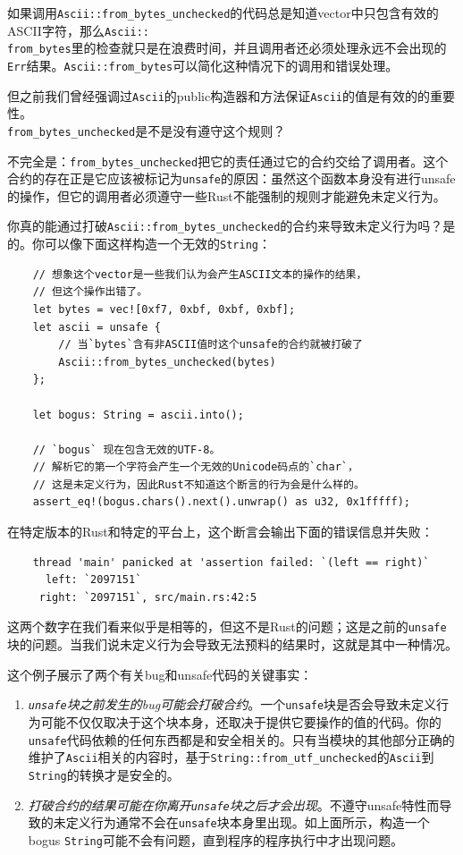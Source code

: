 如果调用\texttt{Ascii::from\_bytes\_unchecked}的代码总是知道vector中只包含有效的ASCII字符，那么\texttt{Ascii::\\
from\_bytes}里的检查就只是在浪费时间，并且调用者还必须处理永远不会出现的\texttt{Err}结果。\texttt{Ascii::from\_bytes}可以简化这种情况下的调用和错误处理。

但之前我们曾经强调过\texttt{Ascii}的public构造器和方法保证\texttt{Ascii}的值是有效的的重要性。\\
\texttt{from\_bytes\_unchecked}是不是没有遵守这个规则？

不完全是：\texttt{from\_bytes\_unchecked}把它的责任通过它的合约交给了调用者。这个合约的存在正是它应该被标记为\texttt{unsafe}的原因：虽然这个函数本身没有进行unsafe的操作，但它的调用者必须遵守一些Rust不能强制的规则才能避免未定义行为。

你真的能通过打破\texttt{Ascii::from\_bytes\_unchecked}的合约来导致未定义行为吗？是的。你可以像下面这样构造一个无效的\texttt{String}：
\begin{verbatim}
    // 想象这个vector是一些我们认为会产生ASCII文本的操作的结果，
    // 但这个操作出错了。
    let bytes = vec![0xf7, 0xbf, 0xbf, 0xbf];
    let ascii = unsafe {
        // 当`bytes`含有非ASCII值时这个unsafe的合约就被打破了
        Ascii::from_bytes_unchecked(bytes)
    };

    let bogus: String = ascii.into();

    // `bogus` 现在包含无效的UTF-8。
    // 解析它的第一个字符会产生一个无效的Unicode码点的`char`，
    // 这是未定义行为，因此Rust不知道这个断言的行为会是什么样的。
    assert_eq!(bogus.chars().next().unwrap() as u32, 0x1fffff);
\end{verbatim}

在特定版本的Rust和特定的平台上，这个断言会输出下面的错误信息并失败：
\begin{verbatim}
    thread 'main' panicked at 'assertion failed: `(left == right)`
      left: `2097151`
     right: `2097151`, src/main.rs:42:5
\end{verbatim}

这两个数字在我们看来似乎是相等的，但这不是Rust的问题；这是之前的\texttt{unsafe}块的问题。当我们说未定义行为会导致无法预料的结果时，这就是其中一种情况。

这个例子展示了两个有关bug和unsafe代码的关键事实：
\begin{enumerate}
    \item \emph{\texttt{unsafe}块之前发生的bug可能会打破合约}。一个\texttt{unsafe}块是否会导致未定义行为可能不仅仅取决于这个块本身，还取决于提供它要操作的值的代码。你的\texttt{unsafe}代码依赖的任何东西都是和安全相关的。只有当模块的其他部分正确的维护了\texttt{Ascii}相关的内容时，基于\texttt{String::from\_utf\_unchecked}的\texttt{Ascii}到\texttt{String}的转换才是安全的。
    \item \emph{打破合约的结果可能在你离开\texttt{unsafe}块之后才会出现}。不遵守unsafe特性而导致的未定义行为通常不会在\texttt{unsafe}块本身里出现。如上面所示，构造一个bogus \texttt{String}可能不会有问题，直到程序的程序执行中才出现问题。
\end{enumerate}

